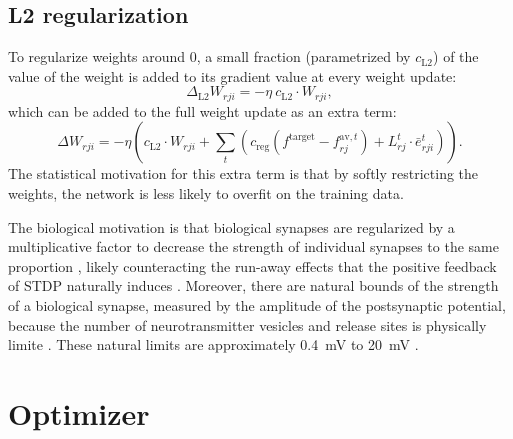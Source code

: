 	\subsection{L2 regularization}
		To regularize weights around 0, a small fraction (parametrized by $c_\text{L2}$) of the value of the weight is added to its gradient value at every weight update:
		\begin{equation}
		\Delta_\text{L2} W_{rji} = -\eta\ c_\text{L2} \cdot W_{rji},
		\end{equation}
		which can be added to the full weight update as an extra term:
		\begin{equation}
		\Delta W_{rji} = -\eta\left(c_\text{L2} \cdot W_{rji} + \sum_t\left(c_\text{reg}\left(f^\text{target} - f^{\text{av}, t}_{rj}\right) + L^t_{rj}\cdot\bar{e}^t_{rji}\right)\right).
		\end{equation}
		The statistical motivation for this extra term is that by softly restricting the weights, the network is less likely to overfit on the training data.

		The biological motivation is that biological synapses are regularized by a multiplicative factor to decrease the strength of individual synapses to the same proportion \citep{turrigiano2000hebb}, likely counteracting the run-away effects that the positive feedback of STDP naturally induces \citep{siddoway2014molecular}.
		Moreover, there are natural bounds of the strength of a biological synapse, measured by the amplitude of the postsynaptic potential, because the number of neurotransmitter vesicles and release sites is physically limite \citep{del1954quantal}.
		These natural limits are approximately \SI{0.4}{\mV} to \SI{20}{\mV} \citep{diaz2006target}.




\section{Optimizer}\label{sec:adam}

